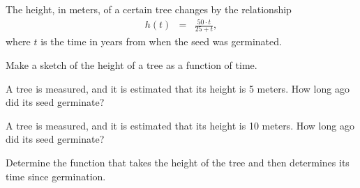 
\begin{problem}
\item The height, in meters, of a certain tree changes by the
  relationship
  \begin{eqnarray*}
    h(t) & = & \frac{50\cdot t}{25+t},
  \end{eqnarray*}
  where $t$ is the time in years from when the seed was germinated. 
  \begin{subproblem}
  \item Make a sketch of the height of a tree as a function of time.
    \vfill
  \item A tree is measured, and it is estimated that its height is 5
    meters. How long ago did its seed germinate?
    \vfill
  \item A tree is measured, and it is estimated that its height is 10
    meters. How long ago did its seed germinate?  
    \vfill
  \item Determine the function that takes the height of the tree and
    then determines its time since germination.
    \vfill
  \end{subproblem}

  \clearpage

\end{problem}


